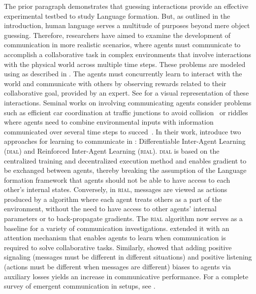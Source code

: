 The prior paragraph demonstrates that guessing interactions provide an effective experimental testbed to study Language formation. But, as outlined in the introduction, human language serves a multitude of purposes beyond mere object guessing. Therefore, \ai researchers have aimed to examine the development of communication in more realistic scenarios, where agents must communicate to accomplish a collaborative task in complex environments that involve interactions with the physical world across multiple time steps. These problems are modeled using \marl as described in . The agents must concurrently learn to interact with the world and communicate with others by observing rewards related to their collaborative goal, provided by an expert. See  for a visual representation of these interactions. Seminal works on \marl involving communicating agents consider problems such as efficient car coordination at traffic junctions to avoid collision~\citep{sukhbaatar2016learning} or riddles where agents need to combine environmental inputs with information communicated over several time steps to succed~\citep{foerster2016learning}. In their work, \citet{foerster2016learning} introduce two approaches for learning to communicate in \marl: Differentiable Inter-Agent Learning (\textsc{dial}) and Reinforced Inter-Agent Learning (\textsc{rial}). \textsc{dial} is based on the centralized training and decentralized execution method and enables gradient to be exchanged between agents, thereby breaking the assumption of the Language formation framework that agents should not be able to have access to each other's internal states. Conversely, in \textsc{rial}, messages are viewed as actions produced by a \rl algorithm where each agent treats others as a part of the environment, without the need to have access to other agents’ internal parameters or to back-propagate gradients. The \textsc{rial} algorithm now serves as a baseline for a variety of \marl communication investigations. \cite{jiang2018learning} extended it with an attention mechanism that enables agents to learn when communication is required to solve collaborative tasks.  Similarly, \citet{eccles2019biases} showed that adding positive signaling (messages must be different in different situations) and positive listening (actions must be different when messages are different) biases to agents via auxiliary losses yields an increase in communicative performance. For a complete survey of emergent communication in \marl setups, see \citet{zhu2022survey}.

